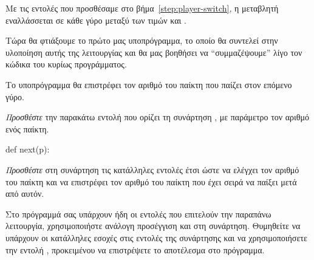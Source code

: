 \documentclass[a4paper,11pt,oneside]{book}
\begin{document}
\begin{step}
Με τις εντολές που προσθέσαμε στο βήμα~\ref{step:player-switch}, η μεταβλητή  εναλλάσσεται σε κάθε γύρο μεταξύ των τιμών  και . 

Τώρα θα φτιάξουμε το πρώτο μας υποπρόγραμμα, το οποίο θα συντελεί στην υλοποίηση αυτής της λειτουργίας και θα μας βοηθήσει να ``συμμαζέψουμε'' λίγο τον κώδικα του κυρίως προγράμματος. 

Το υποπρόγραμμα θα επιστρέφει τον αριθμό του παίκτη που παίζει στον επόμενο γύρο. 




\emph{Προσθέστε} την παρακάτω εντολή που ορίζει τη συνάρτηση , με παράμετρο τον αριθμό  ενός παίκτη.

\begin{pynew}
def next(p):
\end{pynew}



\emph{Προσθέστε} στη συνάρτηση τις κατάλληλες εντολές έτσι ώστε να ελέγχει τον αριθμό  του παίκτη και να επιστρέφει τον αριθμό του παίκτη που έχει σειρά να παίξει μετά από αυτόν. 

\begin{note}
Στο πρόγραμμά σας υπάρχουν ήδη οι εντολές που επιτελούν την παραπάνω λειτουργία, χρησιμοποιήστε ανάλογη προσέγγιση και στη συνάρτηση. Θυμηθείτε να υπάρχουν οι κατάλληλες εσοχές στις εντολές της συνάρτησης και να χρησιμοποιήσετε την εντολή , προκειμένου να επιστρέψετε το αποτέλεσμα στο πρόγραμμα.
\end{note}
\end{step}
\end{document}
